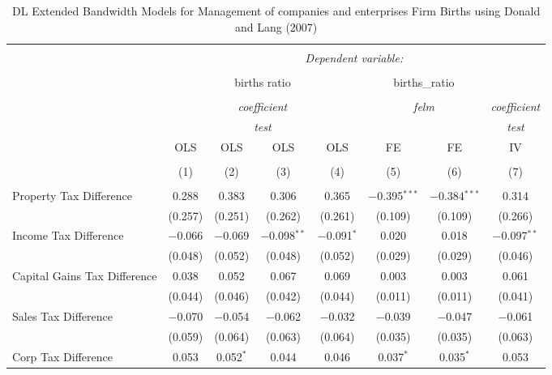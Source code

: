 
\begin{table}[!htbp] \centering 
  \caption{DL Extended Bandwidth Models for  Management of companies and enterprises Firm Births using Donald and Lang (2007)} 
  \label{} 
\begin{tabular}{@{\extracolsep{5pt}}lccccccc} 
\\[-1.8ex]\hline 
\hline \\[-1.8ex] 
 & \multicolumn{7}{c}{\textit{Dependent variable:}} \\ 
\cline{2-8} 
\\[-1.8ex] & \multicolumn{4}{c}{births ratio} & \multicolumn{2}{c}{births\_ratio} &   \\ 
\\[-1.8ex] & \multicolumn{4}{c}{\textit{coefficient}} & \multicolumn{2}{c}{\textit{felm}} & \textit{coefficient} \\ 
 & \multicolumn{4}{c}{\textit{test}} & \multicolumn{2}{c}{\textit{}} & \textit{test} \\ 
 & OLS & OLS & OLS & OLS & FE & FE & IV \\ 
\\[-1.8ex] & (1) & (2) & (3) & (4) & (5) & (6) & (7)\\ 
\hline \\[-1.8ex] 
 Property Tax Difference & 0.288 & 0.383 & 0.306 & 0.365 & $-$0.395$^{***}$ & $-$0.384$^{***}$ & 0.314 \\ 
  & (0.257) & (0.251) & (0.262) & (0.261) & (0.109) & (0.109) & (0.266) \\ 
  Income Tax Difference & $-$0.066 & $-$0.069 & $-$0.098$^{**}$ & $-$0.091$^{*}$ & 0.020 & 0.018 & $-$0.097$^{**}$ \\ 
  & (0.048) & (0.052) & (0.048) & (0.052) & (0.029) & (0.029) & (0.046) \\ 
  Capital Gains Tax Difference & 0.038 & 0.052 & 0.067 & 0.069 & 0.003 & 0.003 & 0.061 \\ 
  & (0.044) & (0.046) & (0.042) & (0.044) & (0.011) & (0.011) & (0.041) \\ 
  Sales Tax Difference & $-$0.070 & $-$0.054 & $-$0.062 & $-$0.032 & $-$0.039 & $-$0.047 & $-$0.061 \\ 
  & (0.059) & (0.064) & (0.063) & (0.064) & (0.035) & (0.035) & (0.063) \\ 
  Corp Tax Difference & 0.053 & 0.052$^{*}$ & 0.044 & 0.046 & 0.037$^{*}$ & 0.035$^{*}$ & 0.053 \\ 

\end{tabular}
\end{table}
